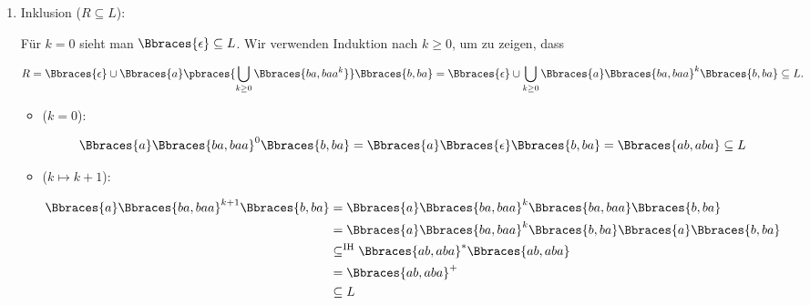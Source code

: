 \begin{solution}
\begin{enumerate}[label = \arabic*.]
\begin{itemize}
    \end{itemize}

    \item Inklusion ($R \subseteq L$):
    
    Für $k = 0$ sieht man $\Bbraces{\epsilon} \subseteq L$.
    Wir verwenden Induktion nach $k \geq 0$, um zu zeigen, dass

    \begin{align*}
        R
        =
        \Bbraces{\epsilon} \cup \Bbraces{a} \pbraces{\bigcup_{k \geq 0} \Bbraces{ba, baa^k}} \Bbraces{b, ba}
        =
        \Bbraces{\epsilon} \cup \bigcup_{k \geq 0} \Bbraces{a} \Bbraces{ba, baa}^k \Bbraces{b, ba}
        \subseteq
        L.
    \end{align*}

    \begin{itemize}
        \item ($k = 0$):
        
        \begin{align*}
            \Bbraces{a} \Bbraces{ba, baa}^0 \Bbraces{b, ba}
            =
            \Bbraces{a} \Bbraces{\epsilon} \Bbraces{b, ba}
            =
            \Bbraces{ab, aba}
            \subseteq
            L
        \end{align*}

        \item ($k \mapsto k + 1$):
        
        \begin{align*}
            \Bbraces{a} \Bbraces{ba, baa}^{k+1} \Bbraces{b, ba}
            & =
            \Bbraces{a} \Bbraces{ba, baa}^k \Bbraces{ba, baa} \Bbraces{b, ba} \\
            & =
            \Bbraces{a} \Bbraces{ba, baa}^k \Bbraces{b, ba} \Bbraces{a} \Bbraces{b, ba} \\
            & \subseteq^\text{IH}
            \Bbraces{ab, aba}^\ast \Bbraces{ab, aba} \\
            & =
            \Bbraces{ab, aba}^+ \\
            & \subseteq
            L
        \end{align*}

    \end{itemize}

\end{enumerate}

\end{solution}

